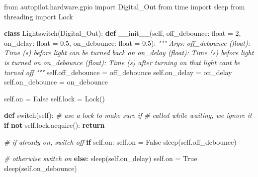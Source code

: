 \documentclass[10pt]{article}
\newenvironment{Shaded}{}{}
\newcommand{\BuiltInTok}[1]{#1}
\newcommand{\CommentTok}[1]{\textcolor[rgb]{0.38,0.63,0.69}{\textit{#1}}}
\newcommand{\ControlFlowTok}[1]{\textcolor[rgb]{0.00,0.44,0.13}{\textbf{#1}}}
\newcommand{\DecValTok}[1]{\textcolor[rgb]{0.25,0.63,0.44}{#1}}
\newcommand{\FloatTok}[1]{\textcolor[rgb]{0.25,0.63,0.44}{#1}}
\newcommand{\FunctionTok}[1]{\textcolor[rgb]{0.02,0.16,0.49}{#1}}
\newcommand{\ImportTok}[1]{#1}
\newcommand{\KeywordTok}[1]{\textcolor[rgb]{0.00,0.44,0.13}{\textbf{#1}}}
\newcommand{\NormalTok}[1]{#1}
\newcommand{\OperatorTok}[1]{\textcolor[rgb]{0.40,0.40,0.40}{#1}}
\newcommand{\VariableTok}[1]{\textcolor[rgb]{0.10,0.09,0.49}{#1}}
\begin{document}
\begin{multicols}{2}
\begin{Shaded}
\begin{Highlighting}[]
\ImportTok{from}\NormalTok{ autopilot.hardware.gpio }\ImportTok{import}\NormalTok{ Digital\_Out}
\ImportTok{from}\NormalTok{ time }\ImportTok{import}\NormalTok{ sleep}
\ImportTok{from}\NormalTok{ threading }\ImportTok{import}\NormalTok{ Lock}

\KeywordTok{class}\NormalTok{ Lightswitch(Digital\_Out):}
  \KeywordTok{def} \FunctionTok{\_\_init\_\_}\NormalTok{(}\VariableTok{self}\NormalTok{,}
\NormalTok{    off\_debounce: }\BuiltInTok{float} \OperatorTok{=} \DecValTok{2}\NormalTok{,}
\NormalTok{    on\_delay:     }\BuiltInTok{float} \OperatorTok{=} \FloatTok{0.5}\NormalTok{,}
\NormalTok{    on\_debounce:  }\BuiltInTok{float} \OperatorTok{=} \FloatTok{0.5}\NormalTok{):}
    \CommentTok{"""}
\CommentTok{    Args:}
\CommentTok{      off\_debounce (float): }
\CommentTok{        Time (s) before light can be turned back on}
\CommentTok{      on\_delay (float): }
\CommentTok{        Time (s) before light is turned on}
\CommentTok{      on\_debounce (float): }
\CommentTok{        Time (s) after turning on that light can\textquotesingle{}t be turned off}
\CommentTok{    """}
    \VariableTok{self}\NormalTok{.off\_debounce }\OperatorTok{=}\NormalTok{ off\_debounce}
    \VariableTok{self}\NormalTok{.on\_delay     }\OperatorTok{=}\NormalTok{ on\_delay}
    \VariableTok{self}\NormalTok{.on\_debounce  }\OperatorTok{=}\NormalTok{ on\_debounce}

    \VariableTok{self}\NormalTok{.on }\OperatorTok{=} \VariableTok{False}
    \VariableTok{self}\NormalTok{.lock }\OperatorTok{=}\NormalTok{ Lock()}

  \KeywordTok{def}\NormalTok{ switch(}\VariableTok{self}\NormalTok{):}
    \CommentTok{\# use a lock to make sure if}
    \CommentTok{\# called while waiting, we ignore it}
    \ControlFlowTok{if} \KeywordTok{not} \VariableTok{self}\NormalTok{.lock.acquire():}
      \ControlFlowTok{return}

    \CommentTok{\# if already on, switch off}
    \ControlFlowTok{if} \VariableTok{self}\NormalTok{.on: }
      \VariableTok{self}\NormalTok{.on }\OperatorTok{=} \VariableTok{False}
\NormalTok{      sleep(}\VariableTok{self}\NormalTok{.off\_debounce)}

    \CommentTok{\# otherwise switch on}
    \ControlFlowTok{else}\NormalTok{: }
\NormalTok{      sleep(}\VariableTok{self}\NormalTok{.on\_delay)}
      \VariableTok{self}\NormalTok{.on }\OperatorTok{=} \VariableTok{True}
\NormalTok{      sleep(}\VariableTok{self}\NormalTok{.on\_debounce)}


\end{Highlighting}
\end{Shaded}
\end{multicols}
\end{document}
